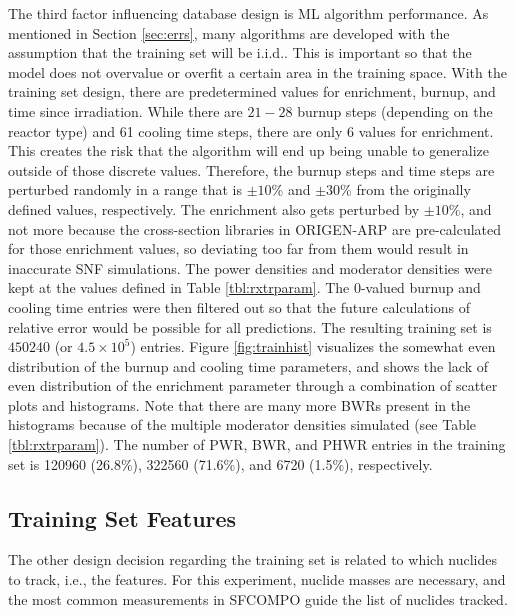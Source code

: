 The third factor influencing database design is \gls{ML} algorithm performance.
As mentioned in Section \ref{sec:errs}, many algorithms are developed with the
assumption that the training set will be \acrfull{i.i.d.}.  This is important
so that the model does not overvalue or overfit a certain area in the training
space. With the training set design, there are predetermined values for
enrichment, burnup, and time since irradiation.  While there are $21-28$ burnup
steps  (depending on the reactor type) and 61 cooling
time steps, there are only 6 values for enrichment. This creates the risk that
the algorithm will end up being unable to generalize outside of those discrete
values. Therefore, the burnup steps and time steps are perturbed randomly in a
range that is $\pm10\%$ and $\pm30\%$ from the originally defined values,
respectively.  The enrichment also gets perturbed by $\pm10\%$, and not more
because the cross-section libraries in \gls{ORIGEN-ARP} are pre-calculated for
those enrichment values, so deviating too far from them would result in
inaccurate \gls{SNF} simulations. The power densities and moderator densities
were kept at the values defined in Table \ref{tbl:rxtrparam}. The 0-valued
burnup and cooling time entries were then filtered out so that the future
calculations of relative error would be possible for all predictions.  The
resulting training set is $450240$ (or $4.5 \times 10^5$) entries.  Figure
\ref{fig:trainhist} visualizes the somewhat even distribution of the burnup and
cooling time parameters, and shows the lack of even distribution of the
enrichment parameter through a combination of scatter plots and histograms.
Note that there are many more \gls{BWR}s present in the histograms because of
the multiple moderator densities simulated (see Table \ref{tbl:rxtrparam}). The
number of \gls{PWR}, \gls{BWR}, and \gls{PHWR} entries in the training set is
120960 (26.8\%), 322560 (71.6\%), and 6720 (1.5\%), respectively.

\subsection{Training Set Features}
\label{sec:snffeats}

The other design decision regarding the training set is related to
which nuclides to track, i.e., the features.  For this experiment, nuclide
masses are necessary, and the most common measurements in \gls{SFCOMPO} guide
the list of nuclides tracked.  

